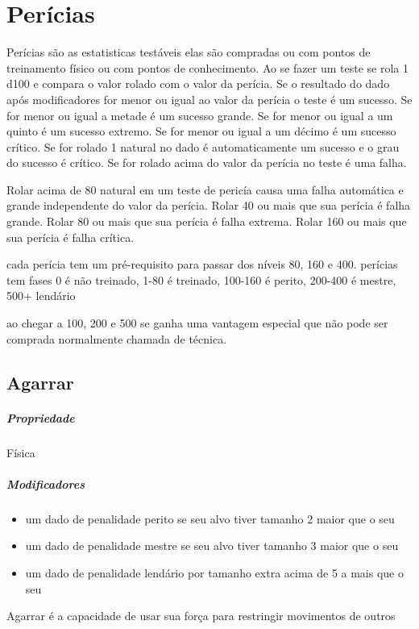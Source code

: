 \chapter{Perícias}
Perícias são as estatisticas testáveis elas são compradas ou com pontos de treinamento físico ou com pontos de conhecimento.
Ao se fazer um teste se rola 1 d100 e compara o valor rolado com o valor da perícia.
Se o resultado do dado após modificadores for menor ou igual ao valor da perícia o teste é um sucesso.
Se for menor ou igual a metade é um sucesso grande.
Se for menor ou igual a um quinto é um sucesso extremo.
Se for menor ou igual a um décimo é um sucesso crítico.
Se for rolado 1 natural no dado é automaticamente um sucesso e o grau do sucesso é crítico.
Se for rolado acima do valor da perícia no teste é uma falha.

Rolar acima de 80 natural em um teste de pericía causa uma falha automática e grande independente do valor da perícia.
Rolar 40 ou mais que sua perícia é falha grande.
Rolar 80 ou mais que sua perícia é falha extrema.
Rolar 160 ou mais que sua perícia é falha crítica.

cada perícia tem um pré-requisito para passar dos níveis 80, 160 e 400.
perícias tem fases 0 é não treinado, 1-80 é treinado, 100-160 é perito,
200-400 é mestre, 500+ lendário

ao chegar a 100, 200 e 500 se ganha uma vantagem especial que não pode ser comprada normalmente chamada de técnica.
\section{Agarrar}
\paragraph{Propriedade} Física
\paragraph{Modificadores} 
\begin{itemize}
  \item um dado de penalidade perito se seu alvo tiver tamanho 2 maior que o seu 
  \item um dado de penalidade mestre se seu alvo tiver tamanho 3 maior que o seu 
  \item um dado de penalidade lendário por tamanho extra acima de 5 a mais que o seu 
\end{itemize}
Agarrar é a capacidade de usar sua força para restringir movimentos de outros
